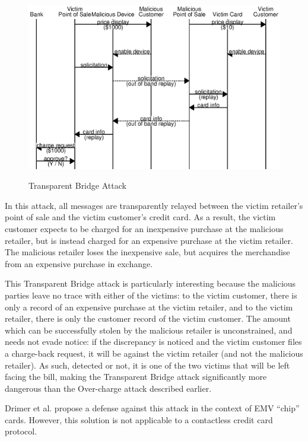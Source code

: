 \begin{figure}
  \caption{Transparent Bridge Attack}
  \centering
  	\hspace*{-0.35in}
    \includegraphics{img/attack-mr-bridge.eps}
  \label{fig:attack_bridge}
\end{figure}

In this attack, all messages are transparently relayed between the victim retailer's point of sale and the victim customer's credit card.
As a result, the victim customer expects to be charged for an inexpensive purchase at the malicious retailer, but is instead charged for an expensive purchase at the victim retailer.
The malicious retailer loses the inexpensive sale, but acquires the merchandise from an expensive purchase in exchange.

This Transparent Bridge attack is particularly interesting because the malicious parties leave no trace with either of the victims:
to the victim customer, there is only a record of an expensive purchase at the victim retailer, and to the victim retailer, there is only the customer record of the victim customer.
The amount which can be successfully stolen by the malicious retailer is unconstrained, and needs not evade notice:
	if the discrepancy is noticed and the victim customer files a charge-back request, it will be against the victim retailer (and not the malicious retailer).
As such, detected or not, it is one of the two victims that will be left facing the bill, making the Transparent Bridge attack significantly more dangerous than the Over-charge attack described earlier.

Drimer et al. propose a defense against this attack in the context of EMV ``chip'' cards.
However, this solution is not applicable to a contactless credit card protocol.
